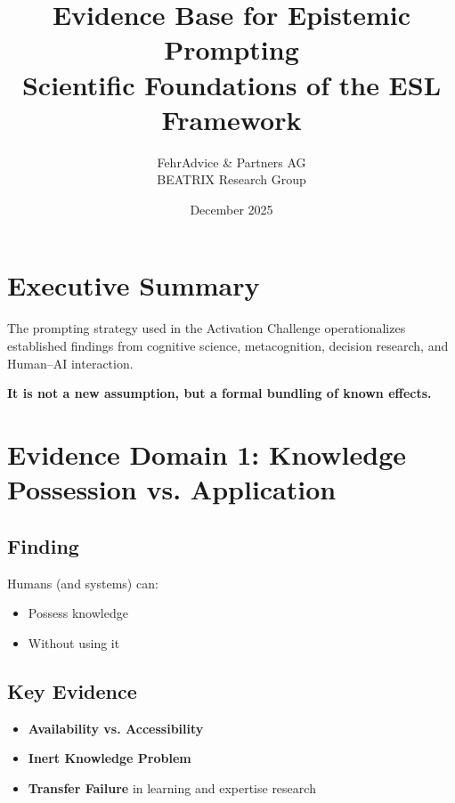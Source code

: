 \documentclass[11pt,a4paper]{article}
\title{\textbf{Evidence Base for Epistemic Prompting}\\
\Large Scientific Foundations of the ESL Framework}
\author{FehrAdvice \& Partners AG\\BEATRIX Research Group}
\date{December 2025}
\begin{document}
\maketitle

\section{Executive Summary}

\begin{keypoint}
The prompting strategy used in the Activation Challenge operationalizes established findings from cognitive science, metacognition, decision research, and Human--AI interaction.

\textbf{It is not a new assumption, but a formal bundling of known effects.}
\end{keypoint}


\section{Evidence Domain 1: Knowledge Possession vs. Application}

\subsection{Finding}

Humans (and systems) can:
\begin{itemize}
    \item Possess knowledge
    \item Without using it
\end{itemize}

\subsection{Key Evidence}

\begin{itemize}
    \item \textbf{Availability vs. Accessibility} \citep{tulving1966availability}
    \item \textbf{Inert Knowledge Problem} \citep{whitehead1929aims}
    \item \textbf{Transfer Failure} in learning and expertise research
\end{itemize}
\end{document}
